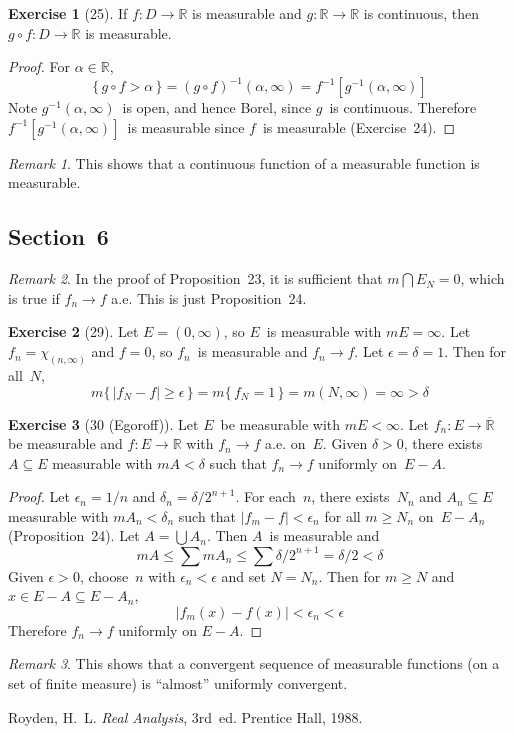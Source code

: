 \documentclass[letterpaper,12pt]{article}
\newcommand{\R}{\mathbb{R}}
\newcommand{\Rex}{\overline{\R}}
\newcommand{\bigunion}{\bigcup}
\newcommand{\bigsect}{\bigcap}
\newcommand{\after}{\circ}
\newcommand{\m}{m}
\newcommand{\abs}[1]{|{#1}|}
\newcommand{\chr}[1]{\chi_{#1}}
\newcommand{\inv}[1]{#1^{-1}}
\theoremstyle{plain}
\theoremstyle{definition}
\newtheorem*{exer}{Exercise}
\theoremstyle{remark}
\newtheorem*{rmk}{Remark}
\begin{document}
\begin{exer}[25]
If \(f:D\to\R\) is measurable and \(g:\R\to\R\) is continuous, then \(g\after f:D\to\R\) is measurable.
\end{exer}
\begin{proof}
For \(\alpha\in\R\),
\[\{\,g\after f>\alpha\,\}=\inv{(g\after f)}(\alpha,\infty)=\inv{f}[\inv{g}(\alpha,\infty)]\]
Note \(\inv{g}(\alpha,\infty)\)~is open, and hence Borel, since \(g\)~is continuous. Therefore \(\inv{f}[\inv{g}(\alpha,\infty)]\)~is measurable since \(f\)~is measurable (Exercise~24).
\end{proof}
\begin{rmk}
This shows that a continuous function of a measurable function is measurable.
\end{rmk}

\subsection*{Section~6}
\begin{rmk}
In the proof of Proposition~23, it is sufficient that \(\m\bigsect E_N=0\), which is true if \(f_n\to f\) a.e. This is just Proposition~24.
\end{rmk}

\begin{exer}[29]
Let \(E=(0,\infty)\), so \(E\)~is measurable with \(\m E=\infty\). Let \(f_n=\chr{(n,\infty)}\) and \(f=0\), so \(f_n\)~is measurable and \(f_n\to f\). Let \(\epsilon=\delta=1\). Then for all~\(N\),
\[\m\{\,\abs{f_N-f}\ge\epsilon\,\}=\m\{\,f_N=1\,\}=\m(N,\infty)=\infty>\delta\]
\end{exer}

\begin{exer}[30 (Egoroff)]
Let \(E\)~be measurable with \(\m E<\infty\). Let \(f_n:E\to\Rex\) be measurable and \(f:E\to\R\) with \(f_n\to f\) a.e. on~\(E\). Given \(\delta>0\), there exists \(A\subseteq E\) measurable with \(\m A<\delta\) such that \(f_n\to f\) uniformly on~\(E-A\).
\end{exer}
\begin{proof}
Let \(\epsilon_n=1/n\) and \(\delta_n=\delta/2^{n+1}\). For each~\(n\), there exists~\(N_n\) and \(A_n\subseteq E\) measurable with \(\m A_n<\delta_n\) such that \(\abs{f_m-f}<\epsilon_n\) for all \(m\ge N_n\) on~\(E-A_n\) (Proposition~24). Let \(A=\bigunion A_n\). Then \(A\)~is measurable and
\[\m A\le\sum\m A_n\le\sum\delta/2^{n+1}=\delta/2<\delta\]
Given \(\epsilon>0\), choose~\(n\) with \(\epsilon_n<\epsilon\) and set \(N=N_n\). Then for \(m\ge N\) and \(x\in E-A\subseteq E-A_n\),
\[\abs{f_m(x)-f(x)}<\epsilon_n<\epsilon\]
Therefore \(f_n\to f\) uniformly on \(E-A\).
\end{proof}
\begin{rmk}
This shows that a convergent sequence of measurable functions (on a set of finite measure) is ``almost'' uniformly convergent.
\end{rmk}

\begin{thebibliography}{0}
 Royden, H.~L. \textit{Real Analysis}, 3rd~ed. Prentice Hall, 1988.
\end{thebibliography}
\end{document}
